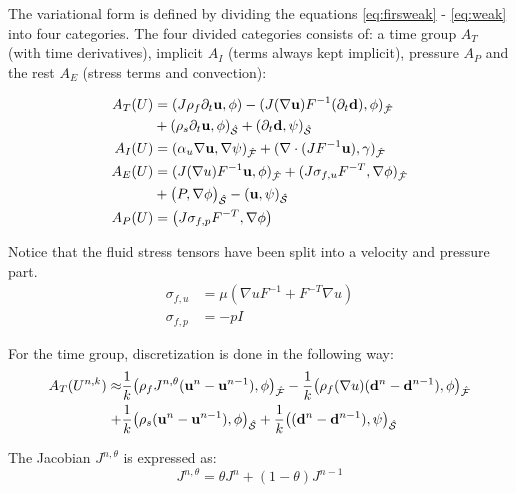 The variational form is defined by dividing the equations \eqref{eq:firsweak} - \eqref{eq:weak}  into four categories. The four divided categories consists of: a time group $A_T$ (with time derivatives), implicit $A_I$ (terms always kept implicit), pressure $A_P$ and the rest $A_E$ (stress terms and convection):

\begin{align}
A_T(U) &= (J \rho_f \partial_t \bold{u} , \phi ) - (J (\nabla \bold{u})F^{-1}(\partial_t \bold{d}) , \phi )_{\mathcal{\hat{F}}} \\
	    & + (\rho_s \partial_t \bold{u} , \phi)_{\mathcal{\hat{S}}} + (\partial_t \bold{d} , \psi)_{\mathcal{\hat{S}}}  \\
A_I(U) &= ( \alpha_u \nabla \bold{u}, \nabla \psi)_{\mathcal{\hat{F}}} + (\nabla \cdot (J F^{-1} \bold{u}), \gamma)_{\mathcal{\hat{F}}} \\
A_E(U) &= (J (\nabla u)F^{-1} \bold{u} , \phi )_{\mathcal{\hat{F}}} + ( J \sigma_{f,u} F^{-T} , \nabla \phi )_{\mathcal{\hat{F}}} \\
	    & + \big(P, \nabla \phi \big)_{\mathcal{\hat{S}}} - ( \bold{u} , \psi )_{\mathcal{\hat{S}}} \\
A_P(U) &= \big( J \sigma_{f,p} F^{-T}, \nabla \phi  \big)  	 		
\end{align}

Notice that the fluid stress tensors have been split into a velocity and pressure part. 
\begin{align}
\sigma_{f,u} &= \mu ( \nabla u F^{-1} + F^{-T} \nabla u) \\
\sigma_{f,p} &= -p I
\end{align}

For the time group, discretization is done in the following way:
\begin{align}
A_T(U^{n,k}) \approx & \frac{1}{k} \big( \rho_f J^{n,\theta} (\bold{u}^n - \bold{u}^{n-1}) , \phi  \big)_{\mathcal{\hat{F}}} - \frac{1}{k} \big( \rho_f (\nabla u ) (\bold{d}^n - \bold{d}^{n-1}) , \phi \big)_{\mathcal{\hat{F}}} \\
+ & \frac{1}{k} \big( \rho_s  (\bold{u}^n - \bold{u}^{n-1}) , \phi  \big)_{\mathcal{\hat{S}}} +  \frac{1}{k} \big( (\bold{d}^n - \bold{d}^{n-1}) , \psi  \big)_{\mathcal{\hat{S}}}
\end{align}

The Jacobian $J^{n, \theta}$ is expressed as:
\begin{equation}
J^{n, \theta} = \theta J^n + (1-\theta)J^{n-1}
\end{equation}

